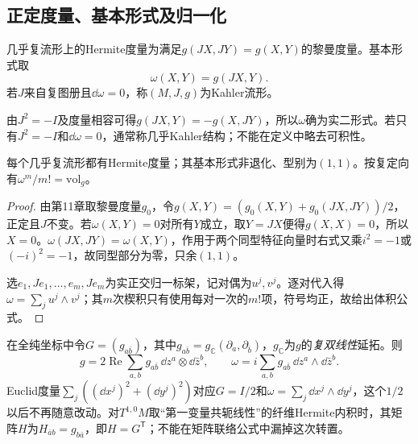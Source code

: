 \subsection{正定度量、基本形式及归一化}
\begin{definition}\label{def:hermitian-kahler}
几乎复流形上的Hermite度量为满足$g(JX,JY)=g(X,Y)$的黎曼度量。基本形式取
\[
 \omega(X,Y)=g(JX,Y).
\]
若$J$来自复图册且$\dd\omega=0$，称$(M,J,g)$为Kahler流形。
\end{definition}
由$J^2=-I$及度量相容可得$g(JX,Y)=-g(X,JY)$，所以$\omega$确为实二形式。若只有$J^2=-I$和$\dd\omega=0$，通常称几乎Kahler结构；不能在定义中略去可积性。

\begin{proposition}\label{prop:hermitian-exists}
每个几乎复流形都有Hermite度量；其基本形式非退化、型别为$(1,1)$。按复定向有$\omega^m/m!=\mathrm{vol}_g$。
\end{proposition}
\begin{proof}
由第11章取黎曼度量$g_0$，令$g(X,Y)=(g_0(X,Y)+g_0(JX,JY))/2$，正定且$J$不变。若$\omega(X,Y)=0$对所有$Y$成立，取$Y=JX$便得$g(X,X)=0$，所以$X=0$。$\omega(JX,JY)=\omega(X,Y)$，作用于两个同型特征向量时右式又乘$i^2=-1$或$(-i)^2=-1$，故同型部分为零，只余$(1,1)$。

选$e_1,Je_1,\ldots,e_m,Je_m$为实正交归一标架，记对偶为$u^j,v^j$。逐对代入得$\omega=\sum_j u^j\wedge v^j$；其$m$次楔积只有使用每对一次的$m!$项，符号均正，故给出体积公式。
\end{proof}
在全纯坐标中令$G=(g_{a\bar b})$，其中$g_{a\bar b}=g_{\mathbb C}(\partial_a,\partial_{\bar b})$，$g_{\mathbb C}$为$g$的\emph{复双线性}延拓。则
\begin{equation}\label{eq:hermitian-normalization}
 g=2\operatorname{Re}\sum_{a,b}g_{a\bar b}\,\dd z^a\otimes\dd\bar z^b,
 \qquad\omega=i\sum_{a,b}g_{a\bar b}\,\dd z^a\wedge\dd\bar z^b.
\end{equation}
Euclid度量$\sum_j((\dd x^j)^2+(\dd y^j)^2)$对应$G=I/2$和$\omega=\sum_j\dd x^j\wedge\dd y^j$，这个$1/2$以后不再随意改动。对$T^{1,0}M$取“第一变量共轭线性”的纤维Hermite内积时，其矩阵$H$为$H_{\bar a b}=g_{b\bar a}$，即$H=G^{\mathsf T}$；不能在矩阵联络公式中漏掉这次转置。

